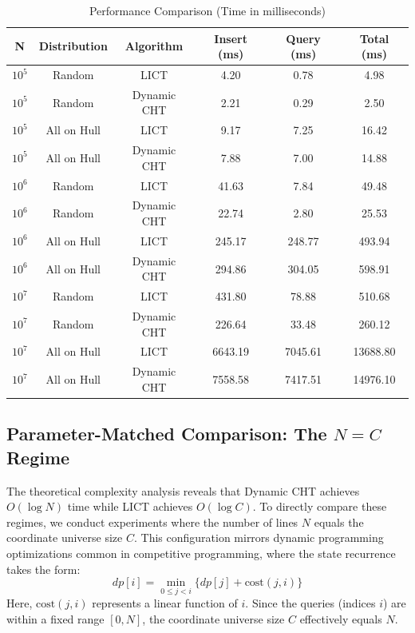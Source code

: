 \documentclass[11pt,a4paper]{article}
\theoremstyle{definition}
\theoremstyle{plain}
\begin{document}
\begin{table}[h]
\centering
\caption{Performance Comparison (Time in milliseconds)}
\label{tab:results}
\begin{tabular}{@{}cccccc@{}}
\toprule
\textbf{N} & \textbf{Distribution} & \textbf{Algorithm} & \textbf{Insert (ms)} & \textbf{Query (ms)} & \textbf{Total (ms)} \\
\midrule
$10^5$ & Random & LICT & 4.20 & 0.78 & 4.98 \\
$10^5$ & Random & Dynamic CHT & 2.21 & 0.29 & 2.50 \\
$10^5$ & All on Hull & LICT & 9.17 & 7.25 & 16.42 \\
$10^5$ & All on Hull & Dynamic CHT & 7.88 & 7.00 & 14.88 \\
\midrule
$10^6$ & Random & LICT & 41.63 & 7.84 & 49.48 \\
$10^6$ & Random & Dynamic CHT & 22.74 & 2.80 & 25.53 \\
$10^6$ & All on Hull & LICT & 245.17 & 248.77 & 493.94 \\
$10^6$ & All on Hull & Dynamic CHT & 294.86 & 304.05 & 598.91 \\
\midrule
$10^7$ & Random & LICT & 431.80 & 78.88 & 510.68 \\
$10^7$ & Random & Dynamic CHT & 226.64 & 33.48 & 260.12 \\
$10^7$ & All on Hull & LICT & 6643.19 & 7045.61 & 13688.80 \\
$10^7$ & All on Hull & Dynamic CHT & 7558.58 & 7417.51 & 14976.10 \\
\bottomrule
\end{tabular}
\end{table}

\subsection{Parameter-Matched Comparison: The $N = C$ Regime}

The theoretical complexity analysis reveals that Dynamic CHT achieves $O(\log N)$ time while LICT achieves $O(\log C)$. To directly compare these regimes, we conduct experiments where the number of lines $N$ equals the coordinate universe size $C$. This configuration mirrors dynamic programming optimizations common in competitive programming, where the state recurrence takes the form:
\[
dp[i] = \min_{0 \le j < i} \{ dp[j] + \text{cost}(j, i) \}
\]
Here, $\text{cost}(j, i)$ represents a linear function of $i$. Since the queries (indices $i$) are within a fixed range $[0, N]$, the coordinate universe size $C$ effectively equals $N$.
\end{document}
